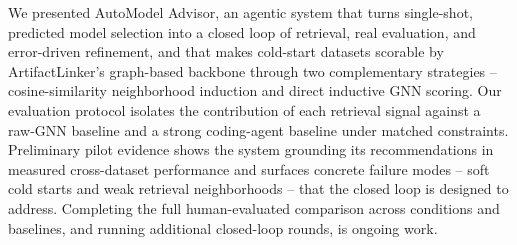 

We presented AutoModel Advisor, an agentic system that turns single-shot, predicted model selection into a closed loop of retrieval, real evaluation, and error-driven refinement, and that makes cold-start datasets scorable by ArtifactLinker's graph-based backbone through two complementary strategies -- cosine-similarity neighborhood induction and direct inductive GNN scoring. Our evaluation protocol isolates the contribution of each retrieval signal against a raw-GNN baseline and a strong coding-agent baseline under matched constraints. Preliminary pilot evidence shows the system grounding its recommendations in measured cross-dataset performance and surfaces concrete failure modes -- soft cold starts and weak retrieval neighborhoods -- that the closed loop is designed to address. Completing the full human-evaluated comparison across conditions and baselines, and running additional closed-loop rounds, is ongoing work.
